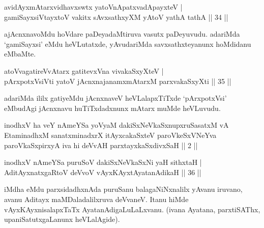 
\begin{shl}
avidAyxmAtarxvidhavxswtx yatoV\s nApatxvadApayxteV |\\
gamiSayxsiVtayxtoV vakitx sAvxsathxyXM yAtoV yathA tathA \hfill || 34 || 
\end{shl}

\begin{artha}
ajAcnxnavoMdu hoVdare paDeyadaMtiruva vasutx paDeyuvudu. adariMda `gamiSayxsi' eMdu heVLutatxde, yAvudariMda savxsathxteyanunx hoMdidanu eMbaMte.
\end{artha}

\begin{shl}
atoV\s vagatireVvAtarx gatitevxVna vivakaSxyXteV |\\
pArxpotxV\s siVti yatoV jAcnxnajanamxmAtarxM parxvakaSxyXti \hfill || 35 || 
\end{shl}

\begin{artha}
adariMda ililx gatiyeMdu jAcnxnaveV heVLalapxTiTxde `pArxpotxVsi' eMbudAgi jAcnxnavu huTiTxdadxnunx mAtarx muMde heVLuvudu.
\end{artha}


\begin{kandikeshl}
inodhxV ha veY nAmeYSa yoV\s yaM dakiSxNeV\s kaSxnupxruSasatxM vA EtaminadhxM sanatxminadxrX itAyxcakaSxteV paroVkeSxVNeYva paroVkaSxpirxyA iva hi deVvAH parxtayxkaSxdivxSaH || 2 ||
\end{kandikeshl}


\begin{shl}
inodhxV nAmeYSa puruSoV dakiSxNeV\s kaSxNi yaH sithxtaH |\\
AditAyxnatxgaRtoV deVvoV vAyxKAyxtAyatanAdikaH \hfill || 36 || 
\end{shl}

\begin{artha}
iMdha eMdu parxsidadhxnAda puruSanu balagaNiNxnalilx yAvanu iruvano, avanu Aditayx maMDaladalilxruva deVvaneV. Itanu hiMde vAyxKAyxnisalapxTaTx \-AyatanAdigaLuLaLxvanu. (ivana Ayatana, parxtiSAThx, upaniSatutxgaLanunx heVLalAgide).
\end{artha}

